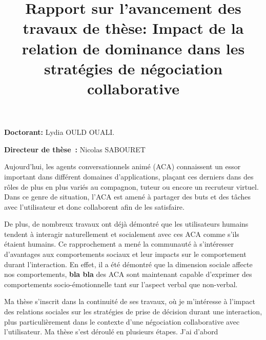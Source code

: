 \documentclass  [french] {article}
\begin{document}
		\title{\vskip -10pt Rapport sur l’avancement des travaux de thèse: Impact de la relation de dominance dans les stratégies de négociation collaborative}
				\maketitle
		
	\textbf{Doctorant:} Lydia OULD OUALI.
	\vspace{1em}


	\textbf{Directeur de thèse :} Nicolas SABOURET
	\vspace{1em}
	
	
	
	
	\par Aujourd’hui, les agents conversationnels animé (ACA) connaissent un essor important dans différent domaines d’applications, plaçant ces derniers dans des rôles de plus en plus variés au compagnon, tuteur  ou encore un recruteur virtuel. Dans ce genre de situation, l'ACA est amené à partager des buts et des tâches avec l'utilisateur et donc collaborent afin de les satisfaire.
	
	De plus, de nombreux travaux ont déjà démontré que les utilisateurs humains tendent à interagir naturellement et socialement avec ces ACA comme s’ils étaient humains. Ce rapprochement a mené la communauté à s'intéresser d'avantages aux comportements sociaux et leur impacts sur le comportement durant l'interaction. En effet, il a été démontré que la dimension sociale affecte nos comportements,  \textbf{ bla bla }des ACA sont maintenant capable d'exprimer des comportements socio-émotionnelle tant sur l'aspect verbal que non-verbal.
	
	Ma thèse s'inscrit dans la continuité de ses travaux, où je m'intéresse à l'impact des relations sociales sur les stratégies de prise de décision durant une interaction, plus particulièrement dans le contexte d'une négociation collaborative avec l'utilisateur. Ma thèse s'est déroulé en plusieurs étapes. 
	J'ai d'abord 
	  
	
	

	
\end{document}
